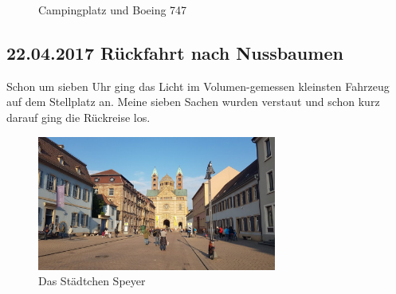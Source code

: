 \begin{figure}[H]
   \centering
   \quad
   \quad
   \quad
   \caption[Campingplatz und Boeing 747]{Campingplatz und Boeing 747}
\end{figure}

\subsection{22.04.2017 Rückfahrt nach Nussbaumen }
Schon um sieben Uhr ging das Licht im Volumen-gemessen kleinsten Fahrzeug auf dem Stellplatz an.
Meine sieben Sachen wurden verstaut und schon kurz darauf ging die Rückreise los. 

\begin{figure}[b]
    \centering
    \includegraphics[width=0.7\textwidth]{../Bilder/Sinsheim/46.jpg}
    \caption{Das Städtchen Speyer}
    \label{img:Sinsheim2}
\end{figure}
